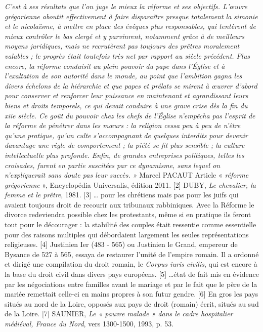 \emph{C'est à ses résultats que l'on juge le mieux la réforme et ses objectifs. L'œuvre grégorienne aboutit effectivement à faire disparaître presque totalement la simonie et le nicolaïsme, à mettre en place des évêques plus responsables, qui tentèrent de mieux contrôler le bas clergé et y parvinrent, notamment grâce à de meilleurs moyens juridiques, mais ne recrutèrent pas toujours des prêtres moralement valables ; le progrès était toutefois très net par rapport au siècle précédent. Plus encore, la réforme conduisit au plein pouvoir du pape dans l'Église et à l'exaltation de son autorité dans le monde, au point que l'ambition gagna les divers échelons de la hiérarchie et que papes et prélats se mirent à œuvrer d'abord pour conserver et renforcer leur puissance en maintenant et agrandissant leurs biens et droits temporels, ce qui devait conduire à une grave crise dès la fin du xiie siècle. Ce goût du pouvoir chez les chefs de l'Église n'empêcha pas l'esprit de la réforme de pénétrer dans les mœurs : la religion cessa peu à peu de n'être qu'une pratique, qu'un culte s'accompagnant de quelques interdits pour devenir davantage une règle de comportement ; la piété se fit plus sensible ; la culture intellectuelle plus profonde. Enfin, de grandes entreprises politiques, telles les croisades, furent en partie suscitées par ce dynamisme, sans lequel on n'expliquerait sans doute pas leur succès. »}
Marcel PACAUT
Article « \emph{réforme grégorienne} », Encyclopédia Universalis, édition 2011. 
[2] DUBY, \emph{Le chevalier, la femme et le prêtre}, 1981.
[3] … pour les chrétiens mais pas pour les juifs qui avaient toujours droit de recourir aux tribunaux rabbiniques. Avec la Réforme le divorce redeviendra possible chez les protestants, même si en pratique ils feront tout pour le décourager : la stabilité des couples était ressentie comme essentielle pour des raisons multiples qui débordaient largement les seules représentations religieuses.
[4] Justinien Ier (483 - 565) ou Justinien le Grand, empereur de Bysance de 527 à 565, essaya de restaurer l'unité de l'empire romain. Il a ordonné et dirigé une compilation du droit romain, le \emph{Corpus iuris civilis}, qui est encore à la base du droit civil dans divers pays européens. 
[5] …état de fait mis en évidence par les négociations entre familles avant le mariage et par le fait que le père de la mariée remettait celle-ci en mains propres à son futur gendre.
[6] En gros les pays situés au nord de la Loire, opposés aux pays de droit (romain) écrit, situés au sud de la Loire.
[7] SAUNIER, \emph{Le « pauvre malade » dans le cadre hospitalier médiéval, France du Nord}, vers 1300-1500, 1993, p. 53.
